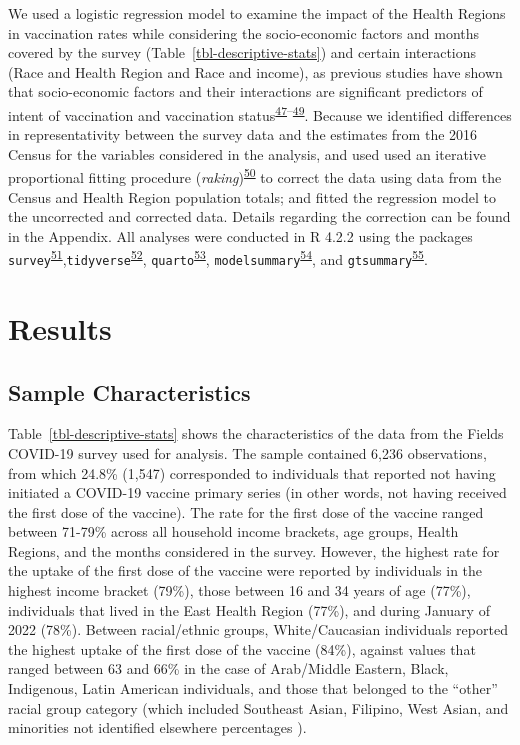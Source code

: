 \documentclass[
]{article}
\begin{document}
We used a logistic regression model to examine the impact of the Health
Regions in vaccination rates while considering the socio-economic
factors and months covered by the survey
(Table~\ref{tbl-descriptive-stats}) and certain interactions (Race and
Health Region and Race and income), as previous studies have shown that
socio-economic factors and their interactions are significant predictors
of intent of vaccination and vaccination
status\textsuperscript{\protect\hyperlink{ref-nguyen2022}{47}--\protect\hyperlink{ref-cnat2022a}{49}}.
Because we identified differences in representativity between the survey
data and the estimates from the 2016 Census for the variables considered
in the analysis, and used used an iterative proportional fitting
procedure
(\emph{raking})\textsuperscript{\protect\hyperlink{ref-deming1940}{50}}
to correct the data using data from the Census and Health Region
population totals; and fitted the regression model to the uncorrected
and corrected data. Details regarding the correction can be found in the
Appendix. All analyses were conducted in R 4.2.2 using the packages
\texttt{survey}\textsuperscript{\protect\hyperlink{ref-lumley2011}{51}},\texttt{tidyverse}\textsuperscript{\protect\hyperlink{ref-wickham2019}{52}},
\texttt{quarto}\textsuperscript{\protect\hyperlink{ref-quarto}{53}},
\texttt{modelsummary}\textsuperscript{\protect\hyperlink{ref-modelsummary}{54}},
and
\texttt{gtsummary}\textsuperscript{\protect\hyperlink{ref-gtsummary}{55}}.

\hypertarget{results}{%
\section{Results}\label{results}}

\hypertarget{sample-characteristics}{%
\subsection{Sample Characteristics}\label{sample-characteristics}}

Table~\ref{tbl-descriptive-stats} shows the characteristics of the data
from the Fields COVID-19 survey used for analysis. The sample contained
6,236 observations, from which 24.8\% (1,547) corresponded to
individuals that reported not having initiated a COVID-19 vaccine
primary series (in other words, not having received the first dose of
the vaccine). The rate for the first dose of the vaccine ranged between
71-79\% across all household income brackets, age groups, Health
Regions, and the months considered in the survey. However, the highest
rate for the uptake of the first dose of the vaccine were reported by
individuals in the highest income bracket (79\%), those between 16 and
34 years of age (77\%), individuals that lived in the East Health Region
(77\%), and during January of 2022 (78\%). Between racial/ethnic groups,
White/Caucasian individuals reported the highest uptake of the first
dose of the vaccine (84\%), against values that ranged between 63 and
66\% in the case of Arab/Middle Eastern, Black, Indigenous, Latin
American individuals, and those that belonged to the ``other'' racial
group category (which included Southeast Asian, Filipino, West Asian,
and minorities not identified elsewhere percentages ).
\end{document}
